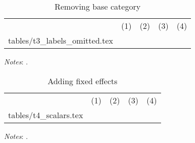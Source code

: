 \documentclass{article}
\makeatletter
\newcommand\primitiveinput[1]
{\@@input #1 }
\makeatother
\begin{document}
\begin{table}[H]
	\centering
	\label{tab:Table}
	\begin{adjustbox}{max width=\linewidth}
		\begin{threeparttable}
			\caption{Removing base category}
			\begin{tabular}{@{}l*{4}{c}@{}}
                \toprule
                \toprule 
				& (1) & (2) & (3) & (4) \\
				\primitiveinput{tables/t3_labels_omitted.tex}
				\bottomrule
			\end{tabular}
			\begin{tablenotes}
				\setlength{}
				\footnotesize
				\item \textit{Notes}: \lipsum[1]. 
			\end{tablenotes}
		\end{threeparttable}
	\end{adjustbox}
\end{table}
\begin{table}[H]
	\centering
	\label{tab:Table}
	\begin{adjustbox}{max width=\linewidth}
		\begin{threeparttable}
			\caption{Adding fixed effects}
			\begin{tabular}{@{}l*{4}{c}@{}}
                \toprule
                \toprule 
				& (1) & (2) & (3) & (4) \\
				\primitiveinput{tables/t4_scalars.tex}
				\bottomrule
			\end{tabular}
			\begin{tablenotes}
				\setlength\labelsep{0pt}
				\footnotesize
				\item \textit{Notes}: \lipsum[1].
			\end{tablenotes}
		\end{threeparttable}
	\end{adjustbox}
\end{table}
\end{document}
